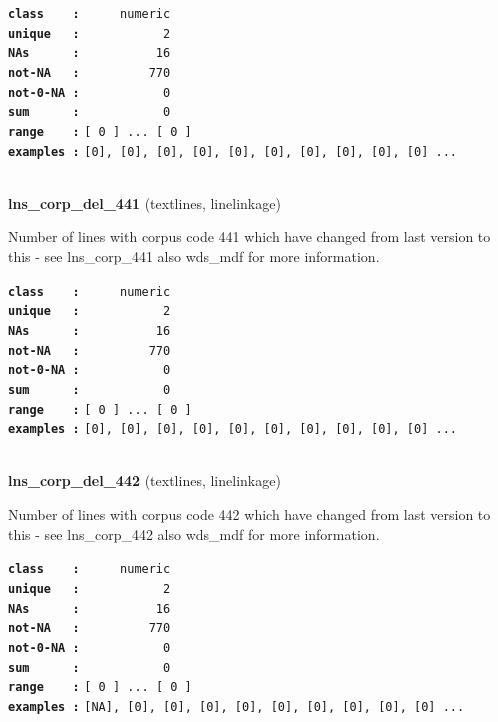 \documentclass[]{article}
\begin{document}
\textbf{\texttt{class\ \ \ \ :}} \texttt{~~~~~numeric}\\
\textbf{\texttt{unique\ \ \ :}} \texttt{~~~~~~~~~~~2}\\
\textbf{\texttt{NAs\ \ \ \ \ \ :}} \texttt{~~~~~~~~~~16}\\
\textbf{\texttt{not-NA\ \ \ :}} \texttt{~~~~~~~~~770}\\
\textbf{\texttt{not-0-NA\ :}} \texttt{~~~~~~~~~~~0}\\
\textbf{\texttt{sum\ \ \ \ \ \ :}} \texttt{~~~~~~~~~~~0}\\
\textbf{\texttt{range\ \ \ \ :}}
\texttt{{[}\ 0\ {]}\ ...\ {[}\ 0\ {]}}\\
\textbf{\texttt{examples\ :}}
\texttt{{[}0{]},\ {[}0{]},\ {[}0{]},\ {[}0{]},\ {[}0{]},\ {[}0{]},\ {[}0{]},\ {[}0{]},\ {[}0{]},\ {[}0{]}\ ...}\\

~

\textbf{lns\_corp\_del\_441} (textlines, linelinkage)

Number of lines with corpus code 441 which have changed from last
version to this - see lns\_corp\_441 also wds\_mdf for more information.

\textbf{\texttt{class\ \ \ \ :}} \texttt{~~~~~numeric}\\
\textbf{\texttt{unique\ \ \ :}} \texttt{~~~~~~~~~~~2}\\
\textbf{\texttt{NAs\ \ \ \ \ \ :}} \texttt{~~~~~~~~~~16}\\
\textbf{\texttt{not-NA\ \ \ :}} \texttt{~~~~~~~~~770}\\
\textbf{\texttt{not-0-NA\ :}} \texttt{~~~~~~~~~~~0}\\
\textbf{\texttt{sum\ \ \ \ \ \ :}} \texttt{~~~~~~~~~~~0}\\
\textbf{\texttt{range\ \ \ \ :}}
\texttt{{[}\ 0\ {]}\ ...\ {[}\ 0\ {]}}\\
\textbf{\texttt{examples\ :}}
\texttt{{[}0{]},\ {[}0{]},\ {[}0{]},\ {[}0{]},\ {[}0{]},\ {[}0{]},\ {[}0{]},\ {[}0{]},\ {[}0{]},\ {[}0{]}\ ...}\\

~

\textbf{lns\_corp\_del\_442} (textlines, linelinkage)

Number of lines with corpus code 442 which have changed from last
version to this - see lns\_corp\_442 also wds\_mdf for more information.

\textbf{\texttt{class\ \ \ \ :}} \texttt{~~~~~numeric}\\
\textbf{\texttt{unique\ \ \ :}} \texttt{~~~~~~~~~~~2}\\
\textbf{\texttt{NAs\ \ \ \ \ \ :}} \texttt{~~~~~~~~~~16}\\
\textbf{\texttt{not-NA\ \ \ :}} \texttt{~~~~~~~~~770}\\
\textbf{\texttt{not-0-NA\ :}} \texttt{~~~~~~~~~~~0}\\
\textbf{\texttt{sum\ \ \ \ \ \ :}} \texttt{~~~~~~~~~~~0}\\
\textbf{\texttt{range\ \ \ \ :}}
\texttt{{[}\ 0\ {]}\ ...\ {[}\ 0\ {]}}\\
\textbf{\texttt{examples\ :}}
\texttt{{[}NA{]},\ {[}0{]},\ {[}0{]},\ {[}0{]},\ {[}0{]},\ {[}0{]},\ {[}0{]},\ {[}0{]},\ {[}0{]},\ {[}0{]}\ ...}\\
\end{document}
